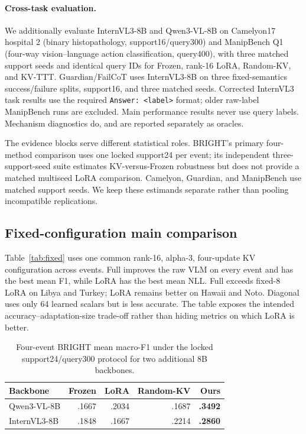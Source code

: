 \documentclass[conference]{IEEEtran}
\newcommand{\KVTTT}{\textsc{KV-TTT}}
\begin{document}
\paragraph{Cross-task evaluation.}
We additionally evaluate InternVL3-8B and Qwen3-VL-8B on Camelyon17 hospital
2 (binary histopathology, support16/query300) and ManipBench Q1 (four-way
vision--language action classification, query400), with three matched support
seeds and identical query IDs for Frozen, rank-16 LoRA, Random-KV, and
\KVTTT{}. Guardian/FailCoT uses InternVL3-8B on three fixed-semantics
success/failure splits, support16, and three matched seeds. Corrected
InternVL3 task results use the required \texttt{Answer: <label>} format; older
raw-label ManipBench runs are excluded. Main performance results never use
query labels. Mechanism diagnostics do, and are reported separately as
oracles.

The evidence blocks serve different statistical roles. BRIGHT's primary
four-method comparison uses one locked support24 per event; its independent
three-support-seed suite estimates KV-versus-Frozen robustness but does not
provide a matched multiseed LoRA comparison. Camelyon, Guardian, and
ManipBench use matched support seeds. We keep these estimands separate rather
than pooling incompatible replications.

\subsection{Fixed-configuration main comparison}
Table~\ref{tab:fixed} uses one common rank-16, alpha-3, four-update KV
configuration across events. Full improves the raw VLM on every event and has
the best mean F1, while LoRA has the best mean NLL. Full exceeds fixed-8 LoRA
on Libya and Turkey; LoRA remains better on Hawaii and Noto. Diagonal uses only
64 learned scalars but is less accurate. The table exposes the intended
accuracy--adaptation-size trade-off rather than hiding metrics on which LoRA is
better.



\begin{table}[t]
\centering\small
\caption{Four-event BRIGHT mean macro-F1 under the locked support24/query300
protocol for two additional 8B backbones.}
\label{tab:brightbackbones}
\begin{tabular}{lrrrr}
\toprule
Backbone & Frozen & LoRA & Random-KV & Ours\\
\midrule
Qwen3-VL-8B & .1667 & .2034 & .1687 & \textbf{.3492}\\
InternVL3-8B & .1848 & .1667 & .2214 & \textbf{.2860}\\
\bottomrule
\end{tabular}
\end{table}
\end{document}
